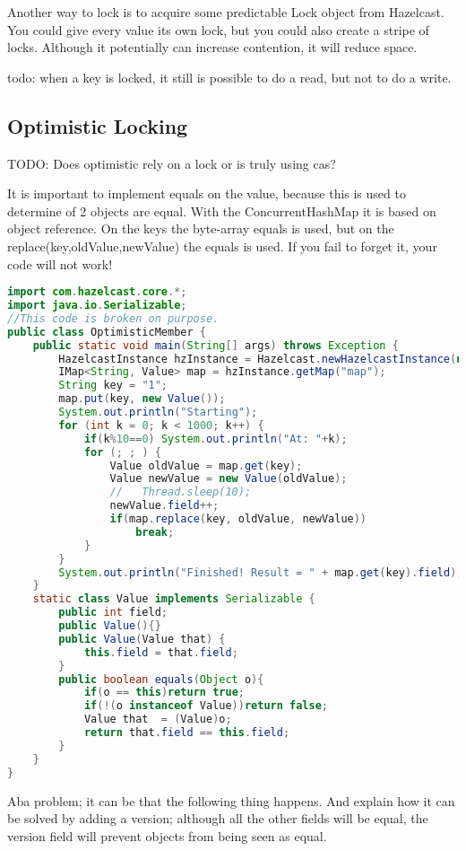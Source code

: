 Another way to lock is to acquire some predictable Lock object from Hazelcast. You could give every value its own lock, but you could also create a stripe of locks. Although it potentially can increase contention, it will reduce space.

todo: when a key is locked, it still is possible to do a read, but not to do a write.

\subsection{Optimistic Locking}
TODO: Does optimistic rely on a lock or is truly using cas?

It is important to implement equals on the value, because this is used to determine of 2 objects are equal. With the ConcurrentHashMap it is based on object reference. On the keys the byte-array equals is used, but on the replace(key,oldValue,newValue) the equals is used. If you fail to forget it, your code will not work!

\begin{lstlisting}[language=java]
import com.hazelcast.core.*;
import java.io.Serializable;
//This code is broken on purpose.
public class OptimisticMember {
    public static void main(String[] args) throws Exception {
        HazelcastInstance hzInstance = Hazelcast.newHazelcastInstance(null);
        IMap<String, Value> map = hzInstance.getMap("map");
        String key = "1";
        map.put(key, new Value());
        System.out.println("Starting");
        for (int k = 0; k < 1000; k++) {
            if(k%10==0) System.out.println("At: "+k);
            for (; ; ) {
                Value oldValue = map.get(key);
                Value newValue = new Value(oldValue);
                //   Thread.sleep(10);
                newValue.field++;
                if(map.replace(key, oldValue, newValue))
                    break;
            }
        }
        System.out.println("Finished! Result = " + map.get(key).field);
    }
    static class Value implements Serializable {
        public int field;
        public Value(){}
        public Value(Value that) {
            this.field = that.field;
        }
        public boolean equals(Object o){
            if(o == this)return true;
            if(!(o instanceof Value))return false;
            Value that  = (Value)o;
            return that.field == this.field;
        }
    }
}
\end{lstlisting}
Aba problem; it can be that the following thing happens. And explain how it can be solved by adding a version; although all the other fields will be equal, the version field will prevent objects from being seen as equal.

